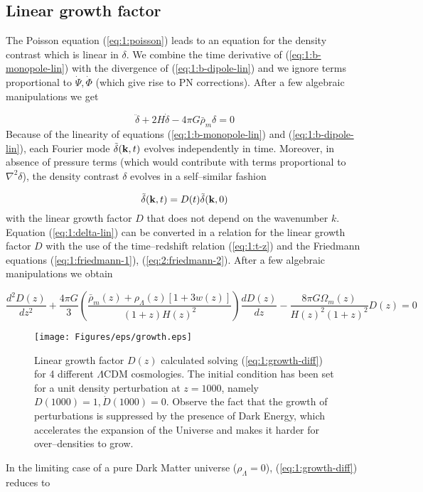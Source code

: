 \subsection{Linear growth factor}
The Poisson equation (\ref{eq:1:poisson}) leads to an equation for the density contrast which is linear in $\delta$. We combine the time derivative of (\ref{eq:1:b-monopole-lin}) with the divergence of (\ref{eq:1:b-dipole-lin}) and we ignore terms proportional to $\dot{\Psi},\dot{\Phi}$ (which give rise to PN corrections). After a few algebraic manipulations we get 

\begin{equation}
\label{eq:1:delta-lin}
\ddot{\delta} + 2H\dot{\delta} - 4\pi G\bar{\rho}_m\delta = 0  
\end{equation} 
%
Because of the linearity of equations (\ref{eq:1:b-monopole-lin}) and (\ref{eq:1:b-dipole-lin}), each Fourier mode $\tilde{\delta}(\mathbf{k},t)$ evolves independently in time. Moreover, in absence of pressure terms (which would contribute with terms proportional to $\nabla^2\delta$), the density contrast $\delta$ evolves in a  self--similar fashion

\begin{equation}
\label{eq:1:selfsim}
\tilde{\delta}(\mathbf{k},t) = D(t)\tilde{\delta}(\mathbf{k},0)
\end{equation}
%
with the linear growth factor $D$ that does not depend on the wavenumber $k$. Equation (\ref{eq:1:delta-lin}) can be converted in a relation for the linear growth factor $D$ with the use of the time--redshift relation (\ref{eq:1:t-z}) and the Friedmann equations (\ref{eq:1:friedmann-1}), (\ref{eq:2:friedmann-2}). After a few algebraic manipulations we obtain

\begin{equation}
\label{eq:1:growth-diff}
\frac{d^2D(z)}{dz^2} + \frac{4\pi G}{3}\left(\frac{\bar{\rho}_m(z)+\rho_\Lambda(z)[1+3w(z)]}{(1+z)H(z)^2}\right)\frac{dD(z)}{dz} -\frac{8\pi G\Omega_m(z)}{H(z)^2(1+z)^2}D(z)= 0
\end{equation}
%
\begin{figure}
\begin{center}
\texttt{[image: Figures/eps/growth.eps]}
\end{center}
\caption{Linear growth factor $D(z)$ calculated solving (\ref{eq:1:growth-diff}) for 4 different $\Lambda$CDM cosmologies. The initial condition has been set for a unit density perturbation at $z=1000$, namely $D(1000)=1, \dot{D}(1000)=0$. Observe the fact that the growth of perturbations is suppressed by the presence of Dark Energy, which accelerates the expansion of the Universe and makes it harder for over--densities to grow.}
\label{fig:1:growth}
\end{figure}
%
In the limiting case of a pure Dark Matter universe ($\rho_\Lambda=0$), (\ref{eq:1:growth-diff}) reduces to

